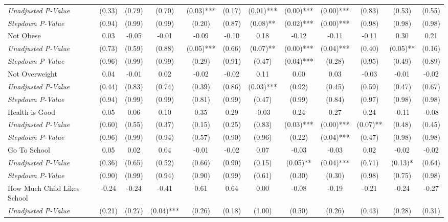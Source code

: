 \begin{tabular}{l c c c c c c c c c c c}
\quad \textit{Unadjusted P-Value} & (0.33) & (0.79) & (0.70) & (0.03)*** & (0.17) & (0.01)*** & (0.00)*** & (0.00)*** & (0.83) & (0.53) & (0.55) \\
\quad \textit{Stepdown P-Value} & (0.94) & (0.99) & (0.99) & (0.20) & (0.87) & (0.08)** & (0.02)*** & (0.00)*** & (0.98) & (0.98) & (0.98) \\
Not Obese & 0.03 & -0.05 & -0.01 & -0.09 & -0.10 & 0.18 & -0.12 & -0.11 & -0.11 & 0.30 & 0.21 \\
\quad \textit{Unadjusted P-Value} & (0.73) & (0.59) & (0.88) & (0.05)*** & (0.66) & (0.07)** & (0.00)*** & (0.04)*** & (0.40) & (0.05)** & (0.16) \\
\quad \textit{Stepdown P-Value} & (0.96) & (0.99) & (0.99) & (0.29) & (0.91) & (0.47) & (0.04)*** & (0.28) & (0.95) & (0.49) & (0.89) \\
Not Overweight & 0.04 & -0.01 & 0.02 & -0.02 & -0.02 & 0.11 & 0.00 & 0.03 & -0.03 & -0.01 & -0.02 \\
\quad \textit{Unadjusted P-Value} & (0.44) & (0.83) & (0.74) & (0.39) & (0.86) & (0.03)*** & (0.92) & (0.45) & (0.59) & (0.47) & (0.67) \\
\quad \textit{Stepdown P-Value} & (0.94) & (0.99) & (0.99) & (0.81) & (0.99) & (0.47) & (0.99) & (0.84) & (0.97) & (0.98) & (0.98) \\
Health is Good & 0.05 & 0.06 & 0.10 & 0.35 & 0.29 & -0.03 & 0.24 & 0.27 & 0.24 & -0.11 & -0.08 \\
\quad \textit{Unadjusted P-Value} & (0.60) & (0.55) & (0.37) & (0.15) & (0.25) & (0.83) & (0.03)*** & (0.00)*** & (0.07)** & (0.48) & (0.45) \\
\quad \textit{Stepdown P-Value} & (0.96) & (0.99) & (0.94) & (0.57) & (0.90) & (0.96) & (0.22) & (0.04)*** & (0.47) & (0.98) & (0.98) \\
Go To School & 0.05 & 0.02 & 0.04 & -0.01 & -0.02 & 0.07 & -0.03 & -0.03 & 0.02 & -0.02 & -0.02 \\
\quad \textit{Unadjusted P-Value} & (0.36) & (0.65) & (0.52) & (0.66) & (0.90) & (0.15) & (0.05)** & (0.04)*** & (0.71) & (0.13)* & (0.64) \\
\quad \textit{Stepdown P-Value} & (0.90) & (0.99) & (0.94) & (0.90) & (0.99) & (0.61) & (0.30) & (0.30) & (0.98) & (0.75) & (0.98) \\
How Much Child Likes School & -0.24 & -0.24 & -0.41 & 0.61 & 0.64 & 0.00 & -0.08 & -0.19 & -0.21 & -0.24 & -0.27 \\
\quad \textit{Unadjusted P-Value} & (0.21) & (0.27) & (0.04)*** & (0.26) & (0.18) & (1.00) & (0.50) & (0.26) & (0.43) & (0.28) & (0.31) \\

\end{tabular}
